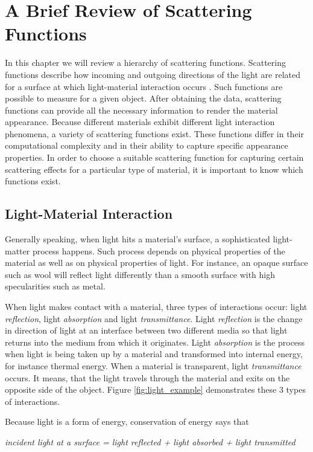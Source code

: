 \chapter{A Brief Review of Scattering Functions}
\label{chapter:appearance}

In this chapter we will review a hierarchy of scattering functions. 
Scattering functions describe how incoming and outgoing directions of the light are related for a surface at which light-material interaction occurs \cite{dong}.
Such functions are possible to measure for a given object.
After obtaining the data, scattering functions can provide all the necessary information to render the material appearance. 
 Because different materials exhibit different light interaction phenomena, a variety of scattering functions exist. 
 These functions differ in their computational complexity and in their ability to capture specific appearance properties.
In order to choose a suitable scattering function for capturing certain scattering effects for a particular type of material,
it is important to know which functions exist. 

	
\section{Light-Material Interaction}
\label{section:light}	

Generally speaking, when light hits a material's surface, a sophisticated light-matter process happens.
Such process depends on physical properties of the material as well as on physical properties of light\cite{wynn}. 
For instance, an opaque surface such as wool will reflect light differently than a smooth surface with high specularities such as metal. 

 When light makes contact with a material, three types of interactions occur: light \emph{reflection}, light \emph{absorption} and light \emph{transmittance}. 
 Light \emph{reflection} is the change in direction of light at an interface between two different media so that light returns into the medium from which it originates.
 Light \emph{absorption} is the process when light is being taken up by a material and transformed into internal energy, for instance thermal energy.
 When a material is transparent, light \emph{transmittance} occurs.
 It means, that the light travels through the material and exits on the opposite side of the object. 
   Figure \ref{fig:light_example} demonstrates these 3 types of interactions.
  
 Because light is a form of energy, conservation of energy says that \cite{wynn}
 \begin{center} 
\emph{incident light at a surface = light reflected + light absorbed + light transmitted}
 \end{center}
 


